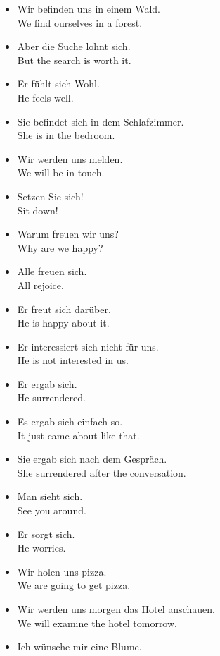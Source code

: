 \begin{itemize}
  \item  Wir befinden uns in einem Wald. \\
  We find ourselves in a forest.
  \item  Aber die Suche lohnt sich. \\
  But the search is worth it.
  \item  Er f{\"u}hlt sich Wohl. \\
  He feels well.
  \item  Sie befindet sich in dem Schlafzimmer. \\
  She is in the bedroom.
  \item  Wir werden uns melden. \\
  We will be in touch.
  \item  Setzen Sie sich! \\
  Sit down!
  \item  Warum freuen wir uns? \\
  Why are we happy?
  \item  Alle freuen sich. \\
  All rejoice.
  \item  Er freut sich dar{\"u}ber. \\
  He is happy about it.
  \item  Er interessiert sich nicht f{\"u}r uns. \\
  He is not interested in us.
  \item  Er ergab sich. \\
  He surrendered.
  \item  Es ergab sich einfach so. \\
  It just came about like that.
  \item  Sie ergab sich nach dem Gespr{\"a}ch. \\
  She surrendered after the conversation.
  \item  Man sieht sich. \\
  See you around.
  \item  Er sorgt sich. \\
  He worries.
  \item  Wir holen uns pizza. \\
  We are going to get pizza.
  \item  Wir werden uns morgen das Hotel anschauen. \\
  We will examine the hotel tomorrow. 
  \item  Ich w{\"u}nsche mir eine Blume. \\

\end{itemize}
